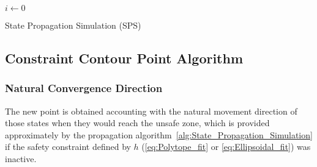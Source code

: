   \begin{algorithm}
    \KwResult{$\xVec$, $\uVec$}
    $i \gets 0$ \;
    \caption{State Propagation Simulation (SPS)} \label{alg:State_Propagation_Simulation}
  \end{algorithm}


\newpage %

\subsection{Constraint Contour Point Algorithm}
\label{subsec:Constraint_Contour_Point_Algorithm}

\subsubsection{Natural Convergence Direction}
\label{subsubsec:Intersection_Vector}

The new point is obtained accounting with the natural movement direction of those states when they would reach the unsafe zone, which is provided approximately by the propagation algorithm~\ref{alg:State_Propagation_Simulation} if the safety constraint defined by \(h\) (\ref{eq:Polytope_fit} or \ref{eq:Ellipsoidal_fit}) was inactive. 



